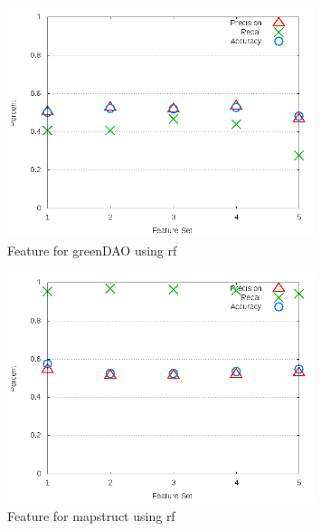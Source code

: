 \begin{figure}[!t]
\centering
\includegraphics[width=0.8\textwidth]{images/rf/test_3/greenDAO_sample_range.png}
\caption{Feature for greenDAO using \gls{rf}}
\label{fig:test_3_greenDAO_rf}
\end{figure}

\begin{figure}[!t]
\centering
\includegraphics[width=0.8\textwidth]{images/rf/test_3/mapstruct_sample_range.png}
\caption{Feature for mapstruct using \gls{rf}}
\label{fig:test_3_mapstruct_rf}
\end{figure}

